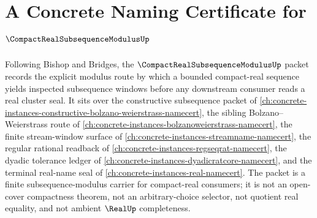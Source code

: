 \chapter{A Concrete Naming Certificate for $\CompactRealSubsequenceModulusUp$}
\label{ch:concrete-instances-compact-real-subsequence-modulus-namecert}

Following Bishop and Bridges, the $\CompactRealSubsequenceModulusUp$ packet records the explicit modulus route by which a bounded compact-real sequence yields inspected subsequence windows before any downstream consumer reads a real cluster seal. It sits over the constructive subsequence packet of \autoref{ch:concrete-instances-constructive-bolzano-weierstrass-namecert}, the sibling Bolzano--Weierstrass route of \autoref{ch:concrete-instances-bolzanoweierstrass-namecert}, the finite stream-window surface of \autoref{ch:concrete-instances-streamname-namecert}, the regular rational readback of \autoref{ch:concrete-instances-regseqrat-namecert}, the dyadic tolerance ledger of \autoref{ch:concrete-instances-dyadicratcore-namecert}, and the terminal real-name seal of \autoref{ch:concrete-instances-real-namecert}. The packet is a finite subsequence-modulus carrier for compact-real consumers; it is not an open-cover compactness theorem, not an arbitrary-choice selector, not quotient real equality, and not ambient $\RealUp$ completeness.


